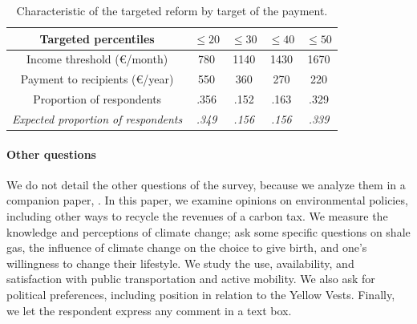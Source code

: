 \documentclass[11pt]{article}
\begin{document}

\begin{table}[H]
\caption{\label{tab:Compensation-amount-by}Characteristic of the targeted
reform by target of the payment.}
\centering%
\begin{tabular}{ccccc}
\hline 
\hline 
Targeted percentiles & $\leq20$ & $\leq30$ & $\leq40$ & $\leq50$\tabularnewline
\hline 
Income threshold (\euro{}/month) & 780 & 1140 & 1430 & 1670\tabularnewline
Payment to recipients (\euro{}/year) & 550 & 360 & 270 & 220\tabularnewline
Proportion of respondents & .356 & .152 & .163 & .329\tabularnewline
\emph{Expected proportion of respondents} & \emph{.349} & \emph{.156} & \emph{.156} & \emph{.339}\tabularnewline
\hline 
\hline 
\end{tabular}

\end{table}


\paragraph{Other questions}
We do not detail the other questions of the survey, because we analyze them in a companion paper, \citet{douenne_french_2019}. In this paper, we examine opinions on environmental policies, including other ways to recycle the revenues of a carbon tax. We measure the knowledge and perceptions of climate change; ask some specific questions on shale gas, the influence of climate change on the choice to give birth, and one's willingness to change their lifestyle. We study the use, availability, and satisfaction with public transportation and active mobility. We also ask for political preferences, including position in relation to the Yellow Vests. Finally, we let the respondent express any comment in a text box.
\end{document}
